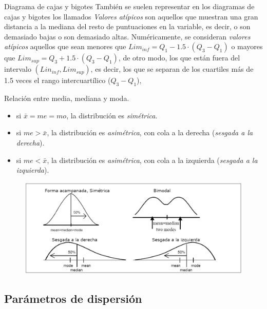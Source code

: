 \begin{myalertblock}{Diagrama de cajas y bigotes}
	\vspace{2mm} También se suelen representar en los diagramas de cajas y bigotes los llamados \emph{Valores atípicos} son aquellos que muestran una gran distancia a la mediana del resto de puntuaciones en la variable, es decir, o son demasiado bajas o son demasiado altas.  Numéricamente, se consideran \emph{valores atípicos} aquellos que sean menores que $Lim_{inf}=Q_1-1.5\cdot (Q_3-Q_1)$ o mayores que $Lim_{sup}=Q_3+1.5\cdot (Q_3-Q_1)$, de otro modo, los que están fuera del intervalo $(Lin_{inf},Lim_{sup})$, es decir, los que se separan de los cuartiles más de 1.5 veces el rango intercuartílico ($Q_3-Q_1$), 
	
	\vspace{2mm} 
	
\end{myalertblock}

\vspace{5mm}%
\begin{myalertblock}{Relación entre media, mediana y moda.}

\begin{itemize}
\item si $\bar{x}=me=mo$, la distribución es \emph{simétrica}.
\item si $me>\bar{x}$, la distribución es \emph{asimétrica}, con cola a la derecha (\emph{sesgada a la derecha}).
\item si $me<\bar{x}$, la distribución es \emph{asimétrica}, con cola a la izquierda (\emph{sesgada a la izquierda}).
\end{itemize}

	 \begin{figure}[H]
			\centering
			\includegraphics[width=1\textwidth]{imagenes/imagenes01/T01IM17.png}
	\end{figure}
	
\end{myalertblock}


\subsection{Parámetros de dispersión}\label{paradisper}
	
